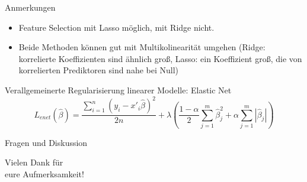 \documentclass[10pt]{beamer}
\begin{document}
\begin{frame}{Anmerkungen}

    \begin{itemize}
        \item Feature Selection mit Lasso möglich, mit Ridge nicht.
        \item Beide Methoden können gut mit Multikolinearität umgehen (Ridge: korrelierte Koeffizienten sind ähnlich groß, Lasso: ein Koeffizient groß, die von korrelierten Prediktoren sind nahe bei Null)
    \end{itemize}
    Verallgemeinerte Regularisierung linearer Modelle: Elastic Net
    \begin{equation*}
        L_{enet}(\hat{\beta})=\frac{\sum_{i=1}^{n}(y_i-x'_i\hat{\beta})^2}{2n}+\lambda(\frac{1-\alpha}{2}\sum_{j=1}^{m}\hat{\beta}_j^2+\alpha\sum_{j=1}^{m}|\hat{\beta}_j|)
    \end{equation*}
    
\end{frame}

\begin{frame}{Fragen und Diskussion}
	\begin{LARGE}
		\begin{center}
			Vielen Dank für\\eure Aufmerksamkeit!
		\end{center}
	\end{LARGE}
\end{frame}
\end{document}
